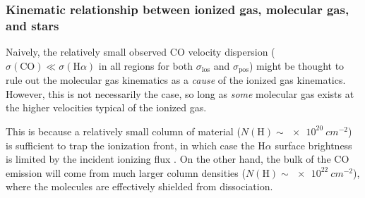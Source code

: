 \documentclass[fleqn,usenatbib, useAMS, a4paper]{mnras}
\newcommand\pos{\ensuremath{_{\mathrm{pos}}}}
\newcommand\los{\ensuremath{_{\mathrm{los}}}}
\newcommand\ha{\ensuremath{\text{H}\alpha}}
\newcommand*\chem[1]{\ensuremath{\mathrm{#1}}}
\begin{document}





\subsubsection{Kinematic relationship between ionized gas, molecular gas, and stars}
\label{sec:kinem-rela-betw}

Naively, the relatively small observed CO velocity dispersion
(\(\sigma(\chem{CO}) \ll \sigma(\ha)\) in all regions
for both \(\sigma\los\) and \(\sigma\pos\))
might be thought to rule out the molecular gas kinematics
as a \emph{cause} of the ionized gas kinematics.
However, this is not necessarily the case, so long as \emph{some} molecular gas
exists at the higher velocities typical of the ionized gas.

This is because a relatively small column of material
(\(N(\chem{H}) \sim \SI{e20}{cm^{-2}}\))
is sufficient to trap the ionization front,
in which case the \ha{} surface brightness is limited by the
incident ionizing flux
\citetext{the Ferland mechanism,
  see section~5.1 of \citealt{Baldwin:1991a}
  and section~B.2.1 of \citealt{Ferland:2012a}
}.
On the other hand, the bulk of the CO emission will come from much larger
column densities (\(N(\chem{H}) \sim \SI{e22}{cm^{-2}}\)),
where the molecules are effectively shielded from dissociation.
\end{document}
